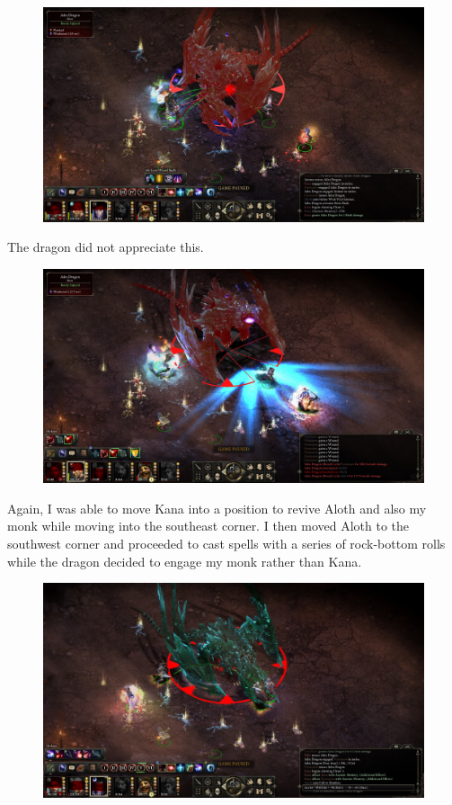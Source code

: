 \documentclass{article}
\begin{document}
\begin{figure}
\includegraphics[scale=0.33]{files/blog/2019_03_17_pillars_of_eternity_path_of_the_damned_act_iv/2019_03_17_dragon1_07.jpg}
\end{figure}

The dragon did not appreciate this.

\begin{figure}
\includegraphics[scale=0.33]{files/blog/2019_03_17_pillars_of_eternity_path_of_the_damned_act_iv/2019_03_17_dragon1_08.jpg}
\end{figure}

Again, I was able to move Kana into a position to revive Aloth and also my monk while moving into the southeast corner.  I then moved Aloth to the southwest corner and proceeded to cast spells with a series of rock-bottom rolls while the dragon decided to engage my monk rather than Kana.

\begin{figure}
\includegraphics[scale=0.33]{files/blog/2019_03_17_pillars_of_eternity_path_of_the_damned_act_iv/2019_03_17_dragon1_09.jpg}
\end{figure}
\end{document}
